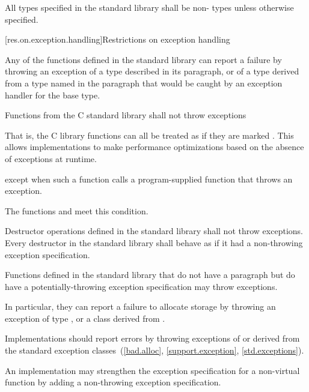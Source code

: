 \pnum
All types specified in the \Cpp{} standard library shall be non- types
unless otherwise specified.

[res.on.exception.handling]{Restrictions on exception handling}%
%

\pnum
Any of the functions defined in the \Cpp{} standard library
%
can report a failure by throwing an exception of a type
described in its \throws paragraph,
or of a type derived from a type named in the \throws paragraph
that would be caught by an exception handler for the base type.

\pnum
Functions from the C standard library shall not throw exceptions%
%
\begin{footnote}
That is, the C
library functions can all be treated as if they
are marked .
This allows implementations to make performance optimizations
based on the absence of exceptions at runtime.
\end{footnote}
except when such a function calls a program-supplied function that throws an
exception.
\begin{footnote}
The functions
and
 meet this condition.
\end{footnote}

\pnum
Destructor operations defined in the \Cpp{} standard library
shall not throw exceptions.
Every destructor in the \Cpp{} standard library shall behave as if it had a
non-throwing exception specification.

\pnum
Functions defined in the
\Cpp{} standard library
%
that do not have a \throws paragraph
but do have a potentially-throwing exception specification
may throw  exceptions.
\begin{footnote}
In particular, they
can report a failure to allocate storage by throwing an exception of type
,
or a class derived from
.
\end{footnote}
Implementations should
report errors by throwing exceptions of or derived
from the standard exception classes~(\ref{bad.alloc},
\ref{support.exception}, \ref{std.exceptions}).

\pnum
An implementation may strengthen the
exception specification
for a non-virtual function
by adding a non-throwing exception specification.

